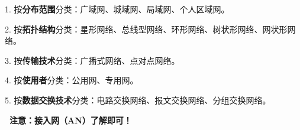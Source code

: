 {1. 按}\textbf{分布范围}{分类：广域网、城域网、局域网、个人区域网。}

2.
按\textbf{拓扑结构}分类：星形网络、总线型网络、环形网络、树状形网络、网状形网络。

3. 按\textbf{传输技术}分类：广播式网络、点对点网络。

4. 按\textbf{使用者}分类：公用网、专用网。

{5.
按}\textbf{数据交换技术}{分类：电路交换网络、报文交换网络、分组交换网络。}

{\textbf{~注意：接入网（AN）了解即可！}}
